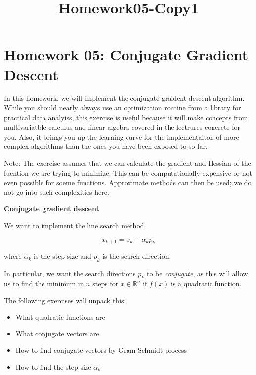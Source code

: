 \documentclass[11pt]{article}
\title{Homework05-Copy1}
\providecommand{\tightlist}{%
      \setlength{\itemsep}{0pt}\setlength{\parskip}{0pt}}
\begin{document}
    
    
    \maketitle
    
    

    
    \hypertarget{homework-05-conjugate-gradient-descent}{%
\section{Homework 05: Conjugate Gradient
Descent}\label{homework-05-conjugate-gradient-descent}}

    In this homework, we will implement the conjugate graident descent
algorithm. While you should nearly always use an optimization routine
from a library for practical data analyiss, this exercise is useful
because it will make concepts from multivariatble calculus and linear
algebra covered in the lectrures concrete for you. Also, it brings you
up the learning curve for the implementaiton of more complex algorithms
than the ones you have been exposed to so far.

Note: The exercise assumes that we can calculate the gradient and
Hessian of the fucntion we are trying to minimize. This can be
computationally expensive or not even possible for soeme functions.
Approximate methods can then be used; we do not go into such
complexities here.

    \textbf{Conjugate gradient descent}

We want to implement the line search method

\[ 
x_{k+1} = x_k + \alpha_k p_k
\]

where \(\alpha_k\) is the step size and \(p_k\) is the search direction.

In particular, we want the search directions \(p_k\) to be
\emph{conjugate}, as this will allow us to find the minimum in \(n\)
steps for \(x \in \mathbb{R}^n\) if \(f(x)\) is a quadratic function.

The following exercises will unpack this:

\begin{itemize}
\tightlist
\item
  What quadratic functions are
\item
  What conjugate vectors are
\item
  How to find conjugate vectors by Gram-Schmidt process
\item
  How to find the step size \(\alpha_k\)
\end{itemize}
\end{document}
